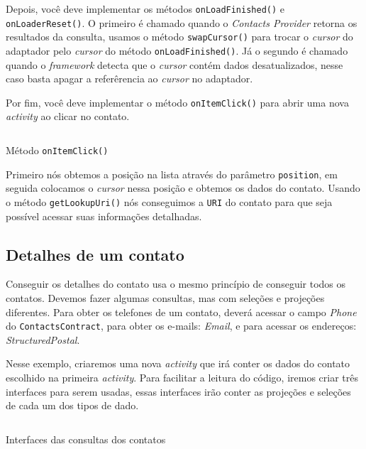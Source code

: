 \documentclass[a4paper,12pt,brazil]{book}
\begin{document}
\begin{singlespace}
	Depois, você deve implementar os métodos \texttt{onLoadFinished()} e \texttt{onLoaderReset()}. O primeiro é chamado quando o \emph{Contacts Provider} retorna os resultados da consulta, usamos o método \texttt{swapCursor()} para trocar o \emph{cursor} do adaptador pelo \emph{cursor} do método \texttt{onLoadFinished()}. Já o segundo é chamado quando o \emph{framework} detecta que o \emph{cursor} contém dados desatualizados, nesse caso basta apagar a referêrencia ao \emph{cursor} no adaptador.
	 
	Por fim, você deve implementar o método \texttt{onItemClick()} para abrir uma nova \emph{activity} ao clicar no contato.

		\begin{listing}[H]
		\inputminted[linenos=true,fontsize=\small,frame=lines, framesep=2mm, tabsize=2,numbersep=5pt]{java}{src/api/contacts/onitemclick.java}
		\caption{Método \texttt{onItemClick()}}
		\label{code:contactonitemclick}
		\end{listing} 	
			
	Primeiro nós obtemos a posição na lista através do parâmetro \texttt{position}, em seguida colocamos o \emph{cursor} nessa posição e obtemos os dados do contato. Usando o método \texttt{getLookupUri()} nós conseguimos a \texttt{URI} do contato para que seja possível acessar suas informações detalhadas.

	\subsection{Detalhes de um contato}

	Conseguir os detalhes do contato usa o mesmo princípio de conseguir todos os contatos. Devemos fazer algumas consultas, mas com seleções e projeções diferentes. Para obter os telefones de um contato, deverá acessar o campo \emph{Phone} do \texttt{ContactsContract}, para obter os e-mails: \emph{Email}, e para acessar os endereços: \emph{StructuredPostal}.

	Nesse exemplo, criaremos uma nova \emph{activity} que irá conter os dados do contato escolhido na primeira \emph{activity}. Para facilitar a leitura do código, iremos criar três interfaces para serem usadas, essas interfaces irão conter as projeções e seleções de cada um dos tipos de dado. 

		\begin{listing}[H]
		\inputminted[linenos=true,fontsize=\small,frame=lines, framesep=2mm, tabsize=2,numbersep=5pt]{java}{src/api/contacts/interfaces.java}
		\caption{Interfaces das consultas dos contatos}
		\label{code:contactinterfaces}
		\end{listing} 	


\end{singlespace}
\end{document}
